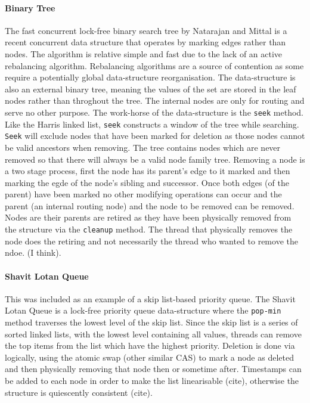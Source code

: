 \paragraph{Binary Tree} The fast concurrent lock-free binary search tree by Natarajan and Mittal is a recent concurrent data structure that operates by marking edges rather than nodes.\cite{LFBinaryTree} The algorithm is relative simple and fast due to the lack of an active rebalancing algorithm. Rebalancing algorithms are a source of contention as some require a potentially global data-structure reorganisation. The data-structure is also an external binary tree, meaning the values of the set are stored in the leaf nodes rather than throghout the tree. The internal nodes are only for routing and serve no other purpose. The work-horse of the data-structure is the \texttt{seek} method. Like the Harris linked list, \texttt{seek} constructs a window of the tree while searching. \texttt{Seek} will exclude nodes that have been marked for deletion as those nodes cannot be valid ancestors when removing. The tree contains nodes which are never removed so that there will always be a valid node family tree. Removing a node is a two stage process, first the node has its parent's edge to it marked and then marking the egde of the node's sibling and successor. Once both edges (of the parent) have been marked no other modifying operations can occur and the parent (an internal routing node) and the node to be removed can be removed. Nodes are their parents are retired as they have been physically removed from the structure via the \texttt{cleanup} method. The thread that physically removes the node does the retiring and not necessarily the thread who wanted to remove the ndoe. (I think).

\paragraph{Shavit Lotan Queue} This was included as an example of a skip list-based priority queue.\cite{ShavitLotanQueue} The Shavit Lotan Queue is a lock-free priority queue data-structure where the \texttt{pop-min} method traverses the lowest level of the skip list. Since the skip list is a series of sorted linked lists, with the lowest level containing all values, threads can remove the top items from the list which have the highest priority. Deletion is done via logically, using the atomic swap (other similar CAS) to mark a node as deleted and then physically removing that node then or sometime after. Timestamps can be added to each node in order to make the list linearisable (cite), otherwise the structure is quiescently consistent (cite).

